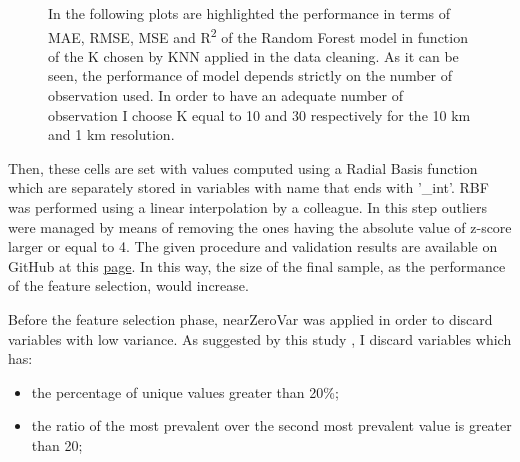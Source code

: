 \begin{figure}[H] 
    \centering
    \hfill%
    \caption{In the following plots are highlighted the performance in terms of MAE, RMSE, MSE and R\textsuperscript{2} of the Random Forest model in function of the K chosen by KNN applied in the data cleaning. As it can be seen, the performance of model depends strictly on the number of observation used. In order to have an adequate number of observation I choose K equal to 10 and 30 respectively for the 10 km and 1  km resolution. }
    \label{fig:knn_chosen}
\end{figure}


Then, these cells are set with values computed using a Radial Basis function \cite{wright2003radial} which are separately stored in variables with name that ends with '\_int'. RBF was performed using a linear interpolation by a colleague.
In this step outliers were managed by means of removing the ones having the absolute value of z-score larger or equal to 4.
The given procedure and validation results are available on GitHub at this
\href{https://github.com/gisgeolab/D-DUST/blob/WP2/Ground\%20Sensor\%20Variables\%20Request\%20.ipynb}{page}.
In this way, the size of the final sample, as the performance of the feature selection, would increase.
\par
Before the feature selection phase, nearZeroVar was applied in order to discard variables with low variance.
As suggested by this study\cite{kuhn2008building} , I discard variables which has: 
\begin{itemize}
    \item the percentage of unique values greater than 20\%;
    \item the ratio of the most prevalent over the second most prevalent value is greater than 20;
\end{itemize} 

